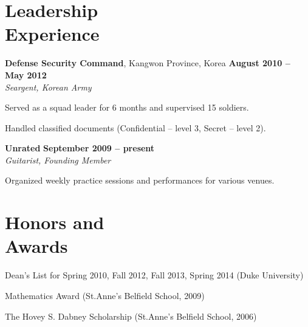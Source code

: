 \documentclass[11pt,margin,line]{cv}
\begin{document}
\begin{resume}
    \section{\mysidestyle Leadership\\Experience}
    \textbf{Defense Security Command}, Kangwon Province, Korea \hfill \textbf{August 2010 -- May 2012}\vspace{1mm}\\\vspace{0mm}%
    \textsl{Seargent, Korean Army}
    \vspace{-2mm}\\\vspace{-1mm}%
    \begin{list3}
        \item Served as a squad leader for 6 months and supervised 15 soldiers.
        \item Handled classified documents (Confidential -- level 3, Secret -- level 2).
    \end{list3}
    \textbf{Unrated}  \hfill \textbf{September 2009 -- present}\vspace{1mm}\\\vspace{0mm}%
    \textsl{Guitarist, Founding Member}
    \vspace{-2mm}\\\vspace{-1mm}%
    \begin{list3}
        \item Organized weekly practice sessions and performances for various venues.
    \end{list3}
    \section{\mysidestyle Honors and\\Awards}
    \begin{list3}
        \item Dean's List for Spring 2010, Fall 2012, Fall 2013, Spring 2014 (Duke University)
        \item Mathematics Award (St.Anne's Belfield School, 2009)
        \item The Hovey S. Dabney Scholarship (St.Anne's Belfield School, 2006)
    \end{list3}

\end{resume}
\end{document}
